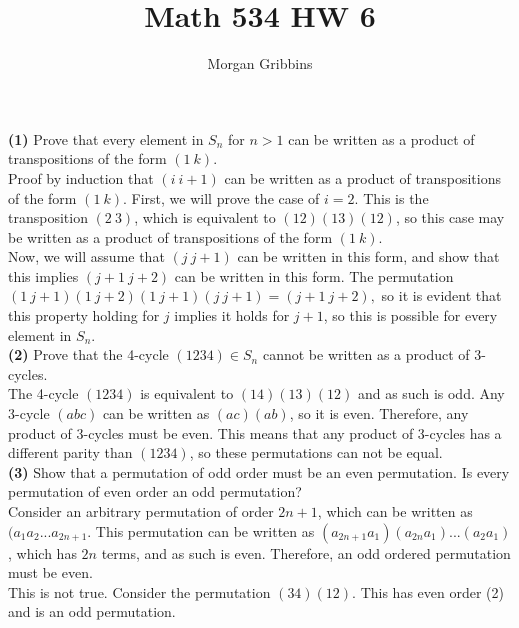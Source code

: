 \documentclass[12pt,letterpaper]{article}
\title{Math 534 HW 6}
\author{Morgan Gribbins}
\date{}
\begin{document}
	
\maketitle

\textbf{(1)} Prove that every element in \(S_{n}\) for \(n > 1\) can be written as a product of transpositions of the form \((1\ k)\). \\

Proof by induction that \((i\ i+1)\) can be written as a product of transpositions of the form \((1\ k)\). First, we will prove the case of \(i = 2\). This is the transposition \((2\ 3)\), which is equivalent to \((12)(13)(12)\), so this case may be written as a product of transpositions of the form \((1\ k)\). \\

 Now, we will assume that \((j\ j+1)\) can be written in this form, and show that this implies \((j+1\ j+2)\) can be written in this form. The permutation \((1\ j+1)(1\ j+2)(1\ j+1)(j\ j+1) = (j+1\ j+2),\) so it is evident that this property holding for \(j\) implies it holds for \(j+1\), so this is possible for every element in \(S_{n}\). \\ 

\textbf{(2)} Prove that the 4-cycle \((1234) \in S_{n}\) cannot be written as a product of 3-cycles. \\

The 4-cycle \((1234)\) is equivalent to \((14)(13)(12)\) and as such is odd. Any 3-cycle \((abc)\) can be written as \((ac)(ab)\), so it is even. Therefore, any product of 3-cycles must be even. This means that any product of 3-cycles has a different parity than \((1234)\), so these permutations can not be equal. \\ 

\textbf{(3)} Show that a permutation of odd order must be an even permutation. Is every permutation of even order an odd permutation? \\

Consider an arbitrary permutation of order \(2n+1\), which can be written as  \((a_{1}a_{2}...a_{2n+1}\). This permutation can be written as \((a_{2n+1}a_{1})(a_{2n}a_{1})...(a_{2}a_{1})\), which has \(2n\) terms, and as such is even. Therefore, an odd ordered permutation must be even. \\

This is not true. Consider the permutation \((34)(12)\). This has even order (2) and is an odd permutation. \\
\end{document}
